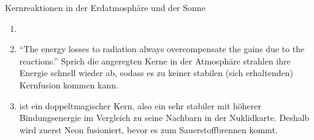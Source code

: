 \documentclass{alex_hü}
\begin{document}
\begin{mybox}{Kernreaktionen in der Erdatmosphäre und der Sonne}
	\centering \(  \)
	\tcblower
	\begin{enumerate}
		\item 
	\tcbline
		\item “The energy losses to radiation always overcompensate the gains due to the reactions.” Sprich die angeregten Kerne in der Atmosphäre strahlen ihre Energie schnell wieder ab, sodass es zu keiner stabilen (sich erhaltenden) Kernfusion kommen kann.
	\tcbline
		\item {} ist ein doppeltmagischer Kern, also ein sehr stabiler mit höherer Bindungsenergie im Vergleich zu seine Nachbarn in der Nuklidkarte. Deshalb wird zuerst Neon fusioniert, bevor es zum Sauerstoffbrennen kommt.
	\end{enumerate}
\end{mybox}
\end{document}
